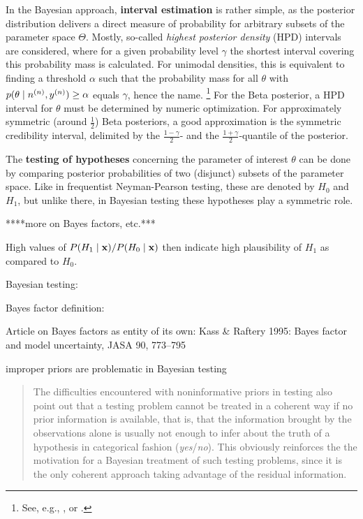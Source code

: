In the Bayesian approach, \textbf{interval estimation} is rather simple,
as the posterior distribution delivers a direct measure of probability for arbitrary subsets of the parameter space $\Theta$.
Mostly, so-called \emph{highest posterior density} (HPD) intervals are considered,
where for a given probability level $\gamma$ the shortest interval covering this probability mass is calculated.
For unimodal densities, this is equivalent to finding a threshold $\alpha$ such that
the probability mass for all $\theta$ with $p(\theta\mid n^{(n)}, y^{(n)}) \ge \alpha$ equals $\gamma$, hence the name.%
\footnote{See, e.g., \cite[\S 5.1.5, pp.~259f]{2000:bernardosmith}, or \cite[Def.~5.5.3, p.~260]{2007:robert}.}
For the Beta posterior, a HPD interval for $\theta$ must be determined by numeric optimization.
For approximately symmetric (around $\frac{1}{2}$) Beta posteriors, a good approximation is the symmetric credibility interval,
delimited by the $\frac{1-\gamma}{2}$- and the $\frac{1+\gamma}{2}$-quantile of the posterior.

The \textbf{testing of hypotheses} concerning the parameter of interest $\theta$ can be done
by comparing posterior probabilities of two (disjunct) subsets of the parameter space.
Like in frequentist Neyman-Pearson testing, these are denoted by $H_0$ and $H_1$,
but unlike there, in Bayesian testing these hypotheses play a symmetric role.

****more on Bayes factors, etc.***

High values of $P(H_1\mid\mathbf{x}) / P(H_0\mid\mathbf{x})$ then indicate high plausibility of $H_1$ as compared to $H_0$.

Bayesian testing: \cite[\S 5.2--5.4]{2007:robert}

Bayes factor definition: \cite[\S 5.2.2, Def.~5.2.5, p.~227]{2007:robert}

Article on Bayes factors as entity of its own: Kass \& Raftery 1995: Bayes factor and model uncertainty, JASA 90, 773--795

improper priors are problematic in Bayesian testing \cite[\S 5.2.5, p.~232ff]{2007:robert}

\cite[p.~235f]{2007:robert}
\begin{quote}
The difficulties encountered with noninformative priors in testing
also point out that a testing problem cannot be treated in a coherent way if no prior information is available,
that is, that the information brought by the observations alone is usually not enough
to infer about the truth of a hypothesis in categorical fashion (\emph{yes}/\emph{no}).
This obviously reinforces the the motivation for a Bayesian treatment of such testing problems,
since it is the only coherent approach taking advantage of the residual information.
\end{quote}

